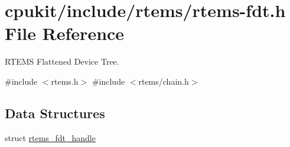 \hypertarget{rtems-fdt_8h}{}\section{cpukit/include/rtems/rtems-\/fdt.h File Reference}
\label{rtems-fdt_8h}


R\+T\+E\+MS Flattened Device Tree.  


{\ttfamily \#include $<$rtems.\+h$>$}\newline
{\ttfamily \#include $<$rtems/chain.\+h$>$}\newline
\subsection*{Data Structures}
\begin{DoxyCompactItemize}
\item 
struct \mbox{\hyperlink{structrtems__fdt__handle}{rtems\+\_\+fdt\+\_\+handle}}
\end{DoxyCompactItemize}
